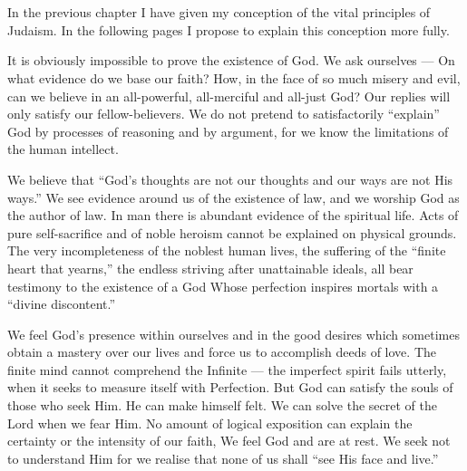 \chapter{}

In the previous chapter I have given my
conception of the vital principles of Judaism.
In the following pages I propose to explain
this conception more fully.

It is obviously impossible to prove the
existence of God. We ask ourselves — On
what evidence do we base our faith? How,
in the face of so much misery and evil, can
we believe in an all-powerful, all-merciful
and all-just God? Our replies will only
satisfy our fellow-believers. We do not
pretend to satisfactorily “explain” God by
processes of reasoning and by argument, for
we know the limitations of the human
intellect.

We believe that “God’s thoughts are not
our thoughts and our ways are not His
ways.” We see evidence around us of the
existence of law, and we worship God as
the author of law. In man there is abundant
evidence of the spiritual life. Acts of pure
self-sacrifice and of noble heroism cannot be
explained on physical grounds. The very
incompleteness of the noblest human lives,
the suffering of the “finite heart that
yearns,” the endless striving after unattainable
ideals, all bear testimony to the existence of a God Whose perfection inspires
mortals with a “divine discontent.”

We feel God’s presence within ourselves
and in the good desires which sometimes
obtain a mastery over our lives and force us
to accomplish deeds of love. The finite
mind cannot comprehend the Infinite — the
imperfect spirit fails utterly, when it seeks
to measure itself with Perfection. But God
can satisfy the souls of those who seek Him.
He can make himself felt. We can solve the
secret of the Lord when we fear Him. No
amount of logical exposition can explain the
certainty or the intensity of our faith, We
feel God and are at rest. We seek not to
understand Him for we realise that none
of us shall “see His face and live.”

